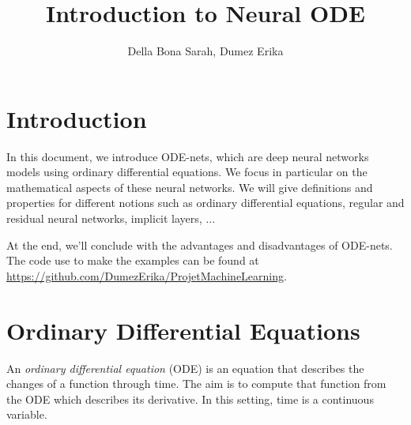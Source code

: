 \documentclass[10pt,a4paper]{article}
\author{Della Bona Sarah, Dumez Erika}
\title{Introduction to Neural ODE}
\theoremstyle{definition}
\theoremstyle{definition}
\theoremstyle{definition}
\begin{document}
\maketitle

\newpage
\tableofcontents

\newpage
\section{Introduction}

In this document, we introduce ODE-nets, which are deep neural networks models using ordinary differential equations. We focus in particular on the mathematical aspects of these neural networks. We will give definitions and properties for different notions such as ordinary differential equations, regular and residual neural networks, implicit layers, ... 

\noindent At the end, we'll conclude with the advantages and disadvantages of ODE-nets.
The code use to make the examples can be found at \url{https://github.com/DumezErika/ProjetMachineLearning}.


\section{Ordinary Differential Equations}

An\textit{ ordinary differential equation} (ODE) \cite{9} is an equation that describes the changes of a function through time. The aim is to compute that function from the ODE which describes its derivative. In this setting, time is a continuous variable.
\end{document}
